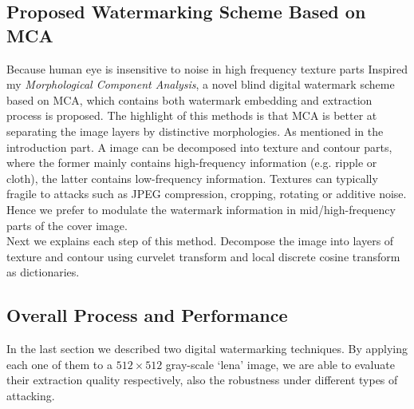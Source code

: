 \subsection{Proposed Watermarking Scheme Based on MCA}
Because human eye is insensitive to noise in high frequency texture parts
Inspired my \textit{Morphological Component Analysis}, a novel blind digital watermark scheme based on MCA, which contains both watermark embedding and extraction process is proposed. The highlight of this methods is that MCA is better at separating the image layers by distinctive morphologies. As mentioned in the introduction part. A image can be decomposed into texture and contour parts, where the former mainly contains high-frequency information (e.g. ripple or cloth), the latter contains low-frequency information. Textures can typically fragile to attacks such as JPEG compression, cropping, rotating or additive noise. Hence we prefer to modulate the watermark information in mid/high-frequency parts of the cover image.\\

Next we explains each step of this method. Decompose the image into layers of texture and contour using curvelet transform and local discrete cosine transform as dictionaries.

\subsection{Overall Process and Performance}
In the last section we described two digital watermarking techniques. By applying each one of them to a $512 \times 512$ gray-scale `lena' image, we are able to evaluate their extraction quality respectively, also the robustness under different types of attacking.  

